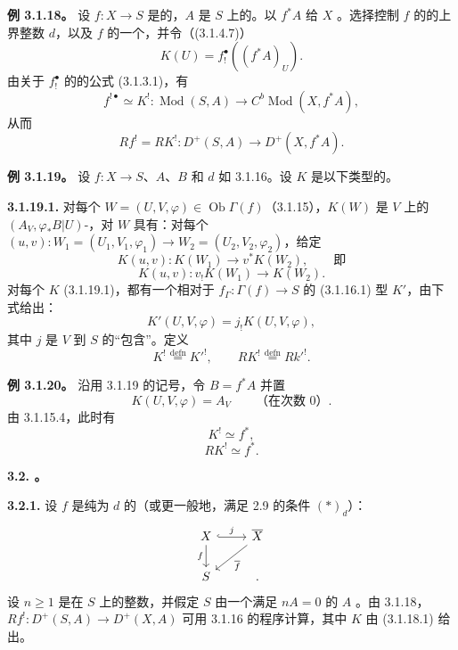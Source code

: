 \textbf{例 3.1.18。} 设 $f\colon X\to S$ 是的，$A$ 是 $S$ 上的。以 $f^*A$ 给 $X$ 。选择控制 $f$ 的的上界整数 $d$，以及 $f$ 的一个，并令（(3.1.4.7)）
\[
 K(U)=f_!^\bullet((f^*A)_U).\tag{3.1.18.1}
\]
由关于 $f_!^\bullet$ 的的公式 (3.1.3.1)，有
\[
 f^{!\bullet}\simeq K^!\colon\operatorname{Mod}(S,A)
 \longrightarrow C^b\operatorname{Mod}(X,f^*A),\tag{3.1.18.2}
\]
从而
\[
 Rf^!=RK^!\colon D^+(S,A)\longrightarrow D^+(X,f^*A).\tag{3.1.18.3}
\]

\textbf{例 3.1.19。} 设 $f\colon X\to S$、$A$、$B$ 和 $d$ 如 3.1.16。设 $K$ 是以下类型的。

\textbf{3.1.19.1.} 对每个 $W=(U,V,\varphi)\in\operatorname{Ob}\Gamma(f)$（3.1.15），$K(W)$ 是 $V$ 上的 $(A_V,\varphi_*B|U)$-，对 $W$ 具有：对每个 $(u,v)\colon W_1=(U_1,V_1,\varphi_1)\to W_2=(U_2,V_2,\varphi_2)$，给定
\[
 K(u,v)\colon K(W_1)\longrightarrow v^*K(W_2),\qquad\text{即}
\]
\[
 K(u,v)\colon v_!K(W_1)\longrightarrow K(W_2).
\]
对每个 $K$ (3.1.19.1)，都有一个相对于 $f_\Gamma\colon\Gamma(f)\to S$ 的 (3.1.16.1) 型 $K'$，由下式给出：
\[
 K'(U,V,\varphi)=j_!K(U,V,\varphi),\tag{3.1.19.2}
\]
其中 $j$ 是 $V$ 到 $S$ 的“包含”。定义
\[
 K^!\mathrel{\mathop=\limits^{\mathrm{defn}}}K'^!,\qquad
 RK^!\mathrel{\mathop=\limits^{\mathrm{defn}}}Rk'^!.
\]

\textbf{例 3.1.20。} 沿用 3.1.19 的记号，令 $B=f^*A$ 并置
\[
 K(U,V,\varphi)=A_V\qquad\text{（在次数 0）}.\tag{3.1.20.1}
\]
由 3.1.15.4，此时有
\[
 K^!\simeq f^*,\tag{3.1.20.2}
\]
\[
 RK^!\simeq f^*.\tag{3.1.20.3}
\]

\textbf{3.2. 。}

\textbf{3.2.1.} 设 $f$ 是纯为 $d$ 的（或更一般地，满足 2.9 的条件 $(*)_d$）：
\[
\begin{tikzcd}
X\arrow[r,hook,"j"]\arrow[d,"f"']&\overline X\arrow[dl,"\overline f"]\\S&.
\end{tikzcd}
\]
设 $n\geq1$ 是在 $S$ 上的整数，并假定 $S$ 由一个满足 $nA=0$ 的 $A$ 。由 3.1.18， $Rf^!\colon D^+(S,A)\to D^+(X,A)$ 可用 3.1.16 的程序计算，其中 $K$ 由 (3.1.18.1) 给出。

